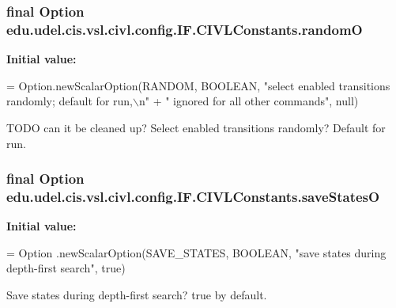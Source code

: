 \subsubsection[{random\+O}]{\setlength{\rightskip}{0pt plus 5cm}final Option edu.\+udel.\+cis.\+vsl.\+civl.\+config.\+I\+F.\+C\+I\+V\+L\+Constants.\+random\+O\hspace{0.3cm}{\ttfamily [static]}}\label{classedu_1_1udel_1_1cis_1_1vsl_1_1civl_1_1config_1_1IF_1_1CIVLConstants_a5372bfb45f6d88e4f226d45d179419a2}
{\bfseries Initial value\+:}
\begin{DoxyCode}
= Option.newScalarOption(RANDOM,
            BOOLEAN, \textcolor{stringliteral}{"select enabled transitions randomly; default for run,\(\backslash\)n"}
                    + \textcolor{stringliteral}{"    ignored for all other commands"}, null)
\end{DoxyCode}


T\+O\+D\+O can it be cleaned up? Select enabled transitions randomly? Default for run. 

\hypertarget{classedu_1_1udel_1_1cis_1_1vsl_1_1civl_1_1config_1_1IF_1_1CIVLConstants_adb4196804e911d1b2d5591d975c76189}{}
\subsubsection[{save\+States\+O}]{\setlength{\rightskip}{0pt plus 5cm}final Option edu.\+udel.\+cis.\+vsl.\+civl.\+config.\+I\+F.\+C\+I\+V\+L\+Constants.\+save\+States\+O\hspace{0.3cm}{\ttfamily [static]}}\label{classedu_1_1udel_1_1cis_1_1vsl_1_1civl_1_1config_1_1IF_1_1CIVLConstants_adb4196804e911d1b2d5591d975c76189}
{\bfseries Initial value\+:}
\begin{DoxyCode}
= Option
            .newScalarOption(SAVE\_STATES, BOOLEAN,
                    \textcolor{stringliteral}{"save states during depth-first search"}, \textcolor{keyword}{true})
\end{DoxyCode}


Save states during depth-\/first search? true by default. 

\hypertarget{classedu_1_1udel_1_1cis_1_1vsl_1_1civl_1_1config_1_1IF_1_1CIVLConstants_ad1d435f50cd553d105059ce1a183696a}{}
